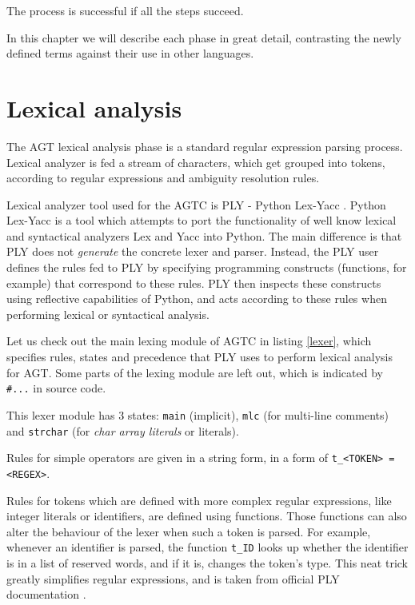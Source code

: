 \documentclass[times, utf8, diplomski]{fer}
\theoremstyle{definition}
\newcommand{\pythoncode}[3]{
    
}
\begin{document}
The process is successful if all the steps succeed.

In this chapter we will describe each phase in great detail, contrasting the
newly defined terms against their use in other languages.

\section{Lexical analysis}

The AGT lexical analysis phase is a standard regular expression parsing process.
Lexical analyzer is fed a stream of characters, which get grouped into tokens,
according to regular expressions and ambiguity resolution rules.

Lexical analyzer tool used for the AGTC is PLY - Python Lex-Yacc \citep{c_ply_beazley}.
Python Lex-Yacc is a tool which attempts to port the functionality of well know
lexical and syntactical analyzers Lex and Yacc into Python. The main difference
is that PLY does not \textit{generate} the 
concrete lexer and parser. Instead, the PLY user defines the rules fed to PLY by
specifying programming 
constructs (functions, for example) that correspond to these rules. 
PLY then inspects these constructs using 
reflective capabilities of Python, and acts according to these rules
when performing lexical or syntactical analysis.

Let us check out the main lexing module of AGTC in listing \ref{lexer}, 
which specifies rules, states and precedence that
PLY uses to perform lexical analysis for AGT. Some parts of the lexing module
are left out, which is indicated by \texttt{\#...} in source code.

\pythoncode{\resdir/compiler/lexer.py}{lexer}{Lexing module}

This lexer module has 3 states: \texttt{main} (implicit), \texttt{mlc} (for multi-line comments) 
and \texttt{strchar} (for \textit{char array literals} or  literals).

Rules for simple operators are given in a string form, 
in a form of \texttt{t\_<TOKEN> = <REGEX>}.

Rules for tokens which are defined with more complex regular expressions, 
like integer literals or identifiers, are defined using functions. 
Those functions can also alter the behaviour of the
lexer when such a token is parsed. For example, whenever an identifier is parsed,
the function \texttt{t\_ID} looks up whether the identifier is in a list of reserved
words, and if it is, changes the token's type. This neat trick greatly simplifies
regular expressions, and is taken from official PLY documentation \citep{c_ply_docs_beazley}.
\end{document}
